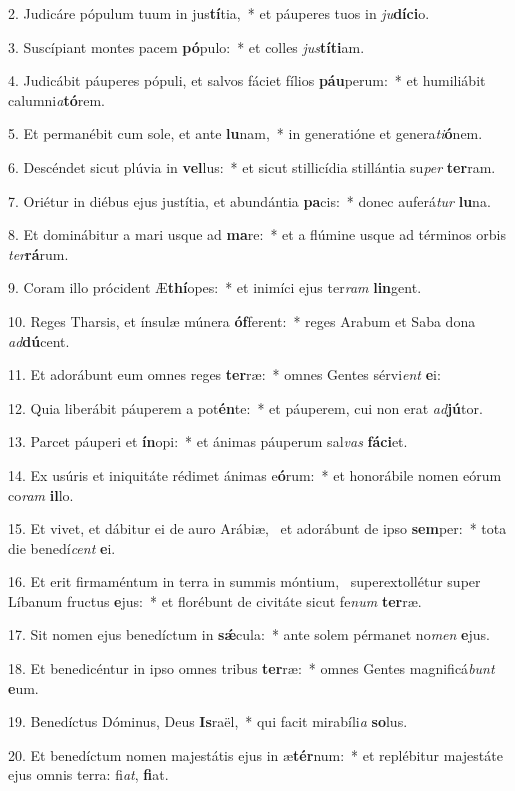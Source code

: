 2. Judicáre pópulum tuum in jus\textbf{tí}tia,~*  et páuperes tuos in \textit{ju}\textbf{dí}\textbf{ci}o.\

3. Suscípiant montes pacem \textbf{pó}pulo:~*  et colles \textit{jus}\textbf{tí}\textbf{ti}am.\

4. Judicábit páuperes pópuli, et salvos fáciet fílios \textbf{páu}perum:~*  et humiliábit calumni\textit{a}\textbf{tó}rem.\

5. Et permanébit cum sole, et ante \textbf{lu}nam,~*  in generatióne et genera\textit{ti}\textbf{ó}nem.\

6. Descéndet sicut plúvia in \textbf{vel}lus:~*  et sicut stillicídia stillántia su\textit{per} \textbf{ter}ram.\

7. Oriétur in diébus ejus justítia, et abundántia \textbf{pa}cis:~*  donec auferá\textit{tur} \textbf{lu}na.\

8. Et dominábitur a mari usque ad \textbf{ma}re:~*  et a flúmine usque ad términos orbis \textit{ter}\textbf{rá}rum.\

9. Coram illo prócident Æ\textbf{thí}opes:~*  et inimíci ejus ter\textit{ram} \textbf{lin}gent.\

10. Reges Tharsis, et ínsulæ múnera \textbf{óf}ferent:~*  reges Arabum et Saba dona \textit{ad}\textbf{dú}cent.\

11. Et adorábunt eum omnes reges \textbf{ter}ræ:~*  omnes Gentes sérvi\textit{ent} \textbf{e}i:\

12. Quia liberábit páuperem a pot\textbf{én}te:~*  et páuperem, cui non erat \textit{ad}\textbf{jú}tor.\

13. Parcet páuperi et \textbf{ín}opi:~*  et ánimas páuperum sal\textit{vas} \textbf{fá}\textbf{ci}et.\

14. Ex usúris et iniquitáte rédimet ánimas e\textbf{ó}rum:~*  et honorábile nomen eórum co\textit{ram} \textbf{il}lo.\

15. Et vivet, et dábitur ei de auro Arábiæ, \dag\  et adorábunt de ipso \textbf{sem}per:~*  tota die benedí\textit{cent} \textbf{e}i.\

16. Et erit firmaméntum in terra in summis móntium, \dag\  superextollétur super Líbanum fructus \textbf{e}jus:~*  et florébunt de civitáte sicut fe\textit{num} \textbf{ter}ræ.\

17. Sit nomen ejus benedíctum in \textbf{sǽ}cula:~*  ante solem pérmanet no\textit{men} \textbf{e}jus.\

18. Et benedicéntur in ipso omnes tribus \textbf{ter}ræ:~*  omnes Gentes magnificá\textit{bunt} \textbf{e}um.\

19. Benedíctus Dóminus, Deus \textbf{Is}raël,~*  qui facit mirabíli\textit{a} \textbf{so}lus.\

20. Et benedíctum nomen majestátis ejus in æ\textbf{tér}num:~*  et replébitur majestáte ejus omnis terra: fi\textit{at}, \textbf{fi}at.\

